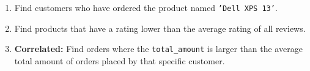 \documentclass[12pt,a4paper]{article}
\begin{document}
\begin{enumerate}
    \item Find customers who have ordered the product named \texttt{'Dell XPS 13'}.

    \item Find products that have a rating lower than the average rating of all reviews.

    \item \textbf{Correlated:} Find orders where the \texttt{total\_amount} is larger than the average total amount of orders placed by that specific customer.

\end{enumerate}
\end{document}
